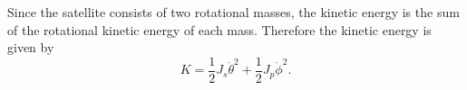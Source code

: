 Since the satellite consists of two rotational masses, the kinetic energy is the sum of the rotational kinetic energy of each mass.  Therefore the kinetic energy is given by
\begin{equation}\label{eq:satellite_kinetic_energy}
K = \frac{1}{2} J_s \dot{\theta}^2 + \frac{1}{2} J_p \dot{\phi}^2.
\end{equation}




